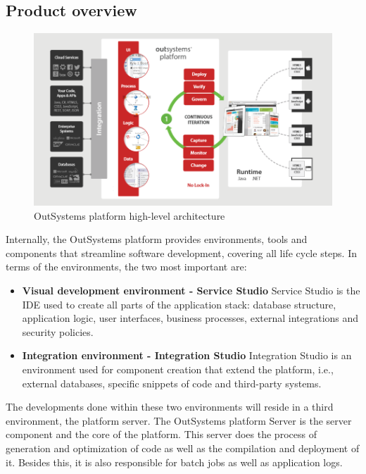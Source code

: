 \documentclass{sigchi}
\begin{document}
\subsection{Product overview}	
\begin{figure}[h!]
	\centering
	\includegraphics[width=0.9\columnwidth]{outsystems-architecture}
	\caption{OutSystems platform high-level architecture}
\end{figure}
		
Internally, the OutSystems platform provides environments, tools and components that streamline software development, covering all life cycle steps. In terms of the environments, the two most important are:

\begin{itemize}
    \item \textbf{Visual development environment - Service Studio} Service Studio is the IDE used to create all parts of the application stack: database structure, application logic, user interfaces, business processes, external integrations and security policies.
    \item \textbf{Integration environment - Integration Studio} Integration Studio is an environment used for component creation that extend the platform, i.e., external databases, specific snippets of code and third-party systems.
\end{itemize}		
 
The developments done within these two environments will reside in a third environment, the platform server. The OutSystems platform Server is the server component and the core of the platform. This server does the process of generation and optimization of code as well as the compilation and deployment of it. Besides this, it is also responsible for batch jobs as well as application logs.
\end{document}
